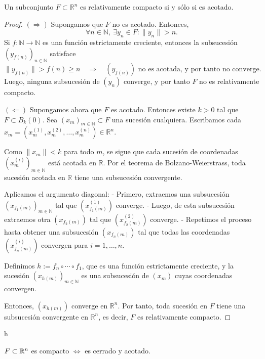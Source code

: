 \clearpage

\begin{prop}
  Un subconjunto $F \subset \mathbb{R}^n$ es relativamente compacto si y sólo si es acotado.
  \begin{proof}
    $(\Rightarrow)$ Supongamos que $F$ no es acotado. Entonces,
    \[
      \forall n \in \mathbb{N},\ \exists y_n \in F : \|y_n\| > n.
    \]
    Si $f : \mathbb{N} \to \mathbb{N}$ es una función estrictamente creciente, entonces la subsucesión $(y_{f(n)})_{n \in \mathbb{N}}$ satisface
    \[
      \|y_{f(n)}\| > f(n) \geq n \quad \Rightarrow \quad (y_{f(n)}) \text{ no es acotada, y por tanto no converge}.
    \]
    Luego, ninguna subsucesión de $(y_n)$ converge, y por tanto $F$ no es relativamente compacto.

    \medskip

    $(\Leftarrow)$ Supongamos ahora que $F$ es acotado. Entonces existe $k > 0$ tal que $F \subset B_k(0)$.
    Sea $(x_m)_{m \in \mathbb{N}} \subset F$ una sucesión cualquiera.
    Escribamos cada $x_m = (x_{m}^{(1)}, x_{m}^{(2)}, \dots, x_{m}^{(n)}) \in \mathbb{R}^n$.

    Como $\|x_m\| < k$ para todo $m$, se sigue que cada sucesión de coordenadas $(x_m^{(i)})_{m \in \mathbb{N}}$ está acotada en $\mathbb{R}$.
    Por el teorema de Bolzano-Weierstrass, toda sucesión acotada en $\mathbb{R}$ tiene una subsucesión convergente.

    Aplicamos el argumento diagonal:
    - Primero, extraemos una subsucesión $(x_{f_1(m)})_{m \in \mathbb{N}}$ tal que $(x_{f_1(m)}^{(1)})$ converge.
    - Luego, de esta subsucesión extraemos otra $(x_{f_2(m)})$ tal que $(x_{f_2(m)}^{(2)})$ converge.
    - Repetimos el proceso hasta obtener una subsucesión $(x_{f_n(m)})$ tal que todas las coordenadas $(x_{f_n(m)}^{(i)})$ convergen para $i = 1, \dots, n$.

    Definimos $h := f_n \circ \cdots \circ f_1$, que es una función estrictamente creciente, y la sucesión $(x_{h(m)})_{m \in \mathbb{N}}$ es una subsucesión de $(x_m)$ cuyas coordenadas convergen.

    Entonces, $(x_{h(m)})$ converge en $\mathbb{R}^n$.
    Por tanto, toda sucesión en $F$ tiene una subsucesión convergente en $\mathbb{R}^n$, es decir, $F$ es relativamente compacto.
  \end{proof}
\end{prop}
h
\begin{corollary}
  $F \subset \mathbb{R}^n$ es compacto $\iff$ es cerrado y acotado.
\end{corollary}

